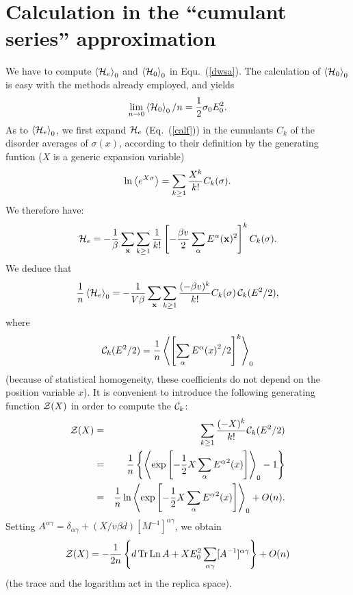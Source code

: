 \section{Calculation in the ``cumulant series'' approximation}
\label{co}
We have to compute $\left\langle{\cal{H}}_e\right\rangle_0$ and
$\left\langle{\cal{H}}_0\right\rangle_0$ in Equ.\ (\ref{dwsa}).
The calculation of $\left\langle{\cal{H}}_0\right\rangle_0$ is easy
with the methods already employed, and yields
\begin{equation}
\lim_{n\to 0}\left\langle
{\cal{H}}_0\right\rangle_0/n =\frac{1}{2}\sigma_0 E_0^2.
\end{equation}
As to $\left\langle{\cal{H}}_e\right\rangle_0$,
we first expand ${\cal{H}}_e$ (Eq.\ (\ref{calf})) in the cumulants
$C_k$ of the disorder averages of $\sigma(x)$, according to their
definition by the generating funtion ($X$ is a generic expansion
variable)
\begin{equation}
\ln\left<e^{X\sigma}\right>=\sum_{k\ge 1} {X^k\over k!}C_k(\sigma).
\end{equation}
We therefore have:
\begin{equation}
\label{fexpand}
{\cal{H}}_e=-{1\over \beta}\sum_{\bf x}\sum_{k\ge 1}{1\over k!}
\left[-{\beta v\over 2}\sum_\alpha{E^\alpha}({\bf x})^2\right]^k
C_k(\sigma).
\end{equation}
We deduce that
\begin{equation}
\label{fob}
{1\over n}\left\langle{\cal{H}}_e\right\rangle_0=-{1\over V\beta}
\sum_{\bf x}\sum_{k\ge 1}{(-\beta v)^k\over k!} C_k(\sigma)\,{\cal{C}}_k(E^2/2),
\end{equation}
where
\begin{equation}
\label{calck}
{\cal{C}}_k(E^2/2)={1\over n}
\left\langle \left[\sum_\alpha{E^\alpha(x)}^2/2\right]^k
\right\rangle_0
\end{equation}
(because of statistical homogeneity, these coefficients do not depend
on the position variable $x$). It is convenient to introduce the
following generating function ${\cal{Z}}(X)$ in order to compute the ${\cal{C}}_k$:
\begin{eqnarray}
{\cal{Z}}(X)&=&\sum_{k\geq 1} {(-X)^k\over k!}{\cal{C}}_k(E^2/2)
\nonumber\\
&=&{1\over n} \left\{\left\langle\exp\left[-{1\over 2}X  \sum_\alpha{E^\alpha}^2(x)\right]
\right\rangle_0-1\right\}
\nonumber\\
&=&{1\over n}\ln\left\langle\exp
\left[-{1\over 2}X \sum_\alpha{E^\alpha}^2(x)\right]
\right\rangle_0+O(n).
\end{eqnarray}
Setting $A^{\alpha\gamma}=\delta_{\alpha\gamma}+(X/v\beta d) [M^{-1}]^{\alpha\gamma}$, we obtain \cite{NOTE2}
\begin{equation}
\label{zx}
{\cal{Z}}(X)=-{1\over 2n} \left\{d\mathop{\text{Tr}}
\mathop{\text{Ln}} A+X E_0^2
\sum_{\alpha\gamma} [A^{-1}]^{\alpha\gamma}\right\}+O(n)
\end{equation}
(the trace and the logarithm act in the replica space).


